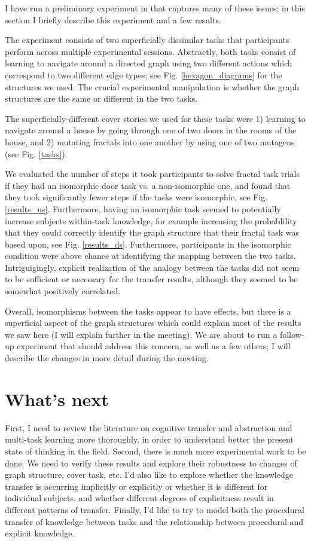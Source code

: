 \documentclass[11pt]{article}
\begin{document}
I have run a preliminary experiment in that captures many of these issues; in this section I briefly describe this experiment and a few results. \par
The experiment consists of two superficially dissimilar tasks that participants perform across multiple experimental sessions. Abstractly, both tasks consist of learning to navigate around a directed graph using two different actions which correspond to two different edge types; see Fig. \ref{hexagon_diagrams} for the structures we used. The crucial experimental manipulation is whether the graph structures are the same or different in the two tasks. \par
The superficially-different cover stories we used for these tasks were 1) learning to navigate around a house by going through one of two doors in the rooms of the house, and 2) mutating fractals into one another by using one of two mutagens (see Fig. \ref{tasks}). \par 
We evaluated the number of steps it took participants to solve fractal task trials if they had an isomorphic door task vs. a non-isomorphic one, and found that they took significantly fewer steps if the tasks were isomorphic, see Fig. \ref{results_ns}. Furthermore, having an isomorphic task seemed to potentially increase subjects within-task knowledge, for example increasing the probablility that they could correctly identify the graph structure that their fractal task was based upon, see Fig. \ref{results_ds}. Furthermore, participants in the isomorphic condition were above chance at identifying the mapping between the two tasks. Intriguigingly, explicit realization of the analogy between the tasks did not seem to be sufficient or necessary for the transfer results, although they seemed to be somewhat positively correlated.\par
Overall, isomorphisms between the tasks appear to have effects, but there is a superficial aspect of the graph structures which could explain most of the results we saw here (I will explain further in the meeting). We are about to run a follow-up experiment that should address this concern, as well as a few others; I will describe the changes in more detail during the meeting. 
\section{What's next}
First, I need to review the literature on cognitive transfer and abstraction and multi-task learning more thoroughly, in order to understand better the present state of thinking in the field. Second, there is much more experimental work to be done. We need to verify these results and explore their robustness to changes of graph structure, cover task, etc. I'd also like to explore whether the knowledge transfer is occurring implicitly or explicitly or whether it is different for individual subjects, and whether different degrees of explicitness result in different patterns of transfer. Finally, I'd like to try to model both the procedural transfer of knowledge between tasks and the relationship between procedural and explicit knowledge. \par 



\end{document}
